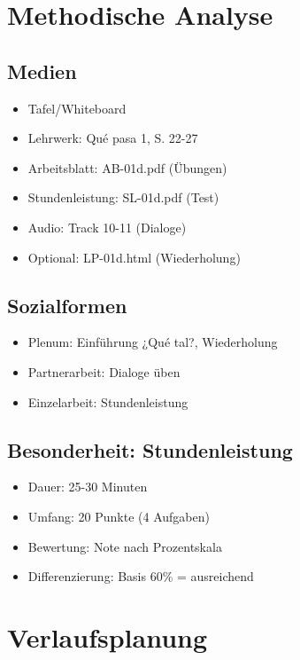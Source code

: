 \documentclass[11pt,a4paper]{article}
\newcommand{\lehrwerk}{Qué pasa 1}
\newcommand{\lehrwerkseite}{S. 22-27}
\begin{document}
\section{Methodische Analyse}

\subsection{Medien}
\begin{itemize}
    \item Tafel/Whiteboard
    \item Lehrwerk: \lehrwerk, \lehrwerkseite
    \item Arbeitsblatt: AB-01d.pdf (Übungen)
    \item Stundenleistung: SL-01d.pdf (Test)
    \item Audio: Track 10-11 (Dialoge)
    \item Optional: LP-01d.html (Wiederholung)
\end{itemize}

\subsection{Sozialformen}
\begin{itemize}
    \item Plenum: Einführung ¿Qué tal?, Wiederholung
    \item Partnerarbeit: Dialoge üben
    \item Einzelarbeit: Stundenleistung
\end{itemize}

\subsection{Besonderheit: Stundenleistung}
\begin{itemize}
    \item Dauer: 25-30 Minuten
    \item Umfang: 20 Punkte (4 Aufgaben)
    \item Bewertung: Note nach Prozentskala
    \item Differenzierung: Basis 60\% = ausreichend
\end{itemize}

\section{Verlaufsplanung}
\end{document}
